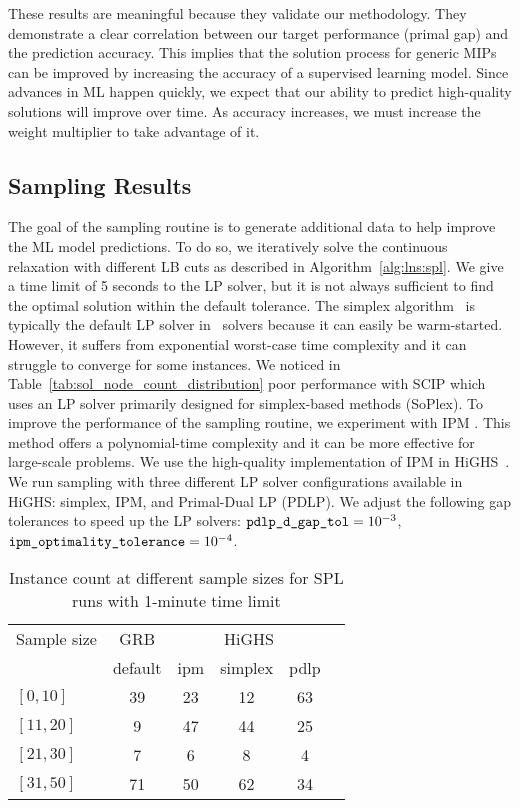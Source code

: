 \documentclass[3p, authoryear, times]{elsarticle}
\begin{document}
These results are meaningful because they validate our methodology. They demonstrate a clear correlation between our target performance (primal gap) and the prediction accuracy. This implies that the solution process for generic MIPs can be improved by increasing the accuracy of a supervised learning model. Since advances in ML happen quickly, we expect that our ability to predict high-quality solutions will improve over time. As accuracy increases, we must increase the weight multiplier to take advantage of it. 



\subsection{Sampling Results} \label{sec:lns:sampling_results}
The goal of the sampling routine is to generate additional data to help improve the ML model predictions. To do so, we iteratively solve the continuous relaxation with different LB cuts as described in Algorithm~\ref{alg:lns:spl}. We give a time limit of 5 seconds to the LP solver, but it is not always sufficient to find the optimal solution within the default tolerance.   The simplex algorithm~\citep{dantzig1951maximization} is typically the default LP solver in \bnb\ solvers because it can easily be warm-started. However, it suffers from exponential worst-case time complexity and it can struggle to converge for some instances. We noticed in Table~\ref{tab:sol_node_count_distribution} poor performance with SCIP which uses an LP solver primarily designed for simplex-based methods (SoPlex). To improve the performance of the sampling routine, we experiment with IPM \citep{karmarkar_new_1984}. This method offers a polynomial-time complexity and it can be more effective for large-scale problems. We use the high-quality implementation of IPM in HiGHS~\citep{huangfu_parallelizing_2018}. We run sampling with three different LP solver configurations available in HiGHS: simplex, IPM, and Primal-Dual LP (PDLP). We adjust the following gap tolerances to speed up the LP solvers: $\varname{pdlp_d_gap_tol} = 10^{-3}$, 
$\varname{ipm_optimality_tolerance} = 10^{-4}$. 

\begin{table}[h]
\centering
\caption{Instance count at different sample sizes for SPL runs with 1-minute time limit}
\label{tab:sample_size_distribution}
\begin{tabular}{lccccc}
\toprule
{Sample size} & {GRB} & \multicolumn{3}{c}{HiGHS} \\
{} & {default} & {ipm} & {simplex} & {pdlp} \\
\midrule
$[0, 10]$ & 39 & 23 & 12 & 63 \\
$[11, 20]$ & 9 & 47 & 44 & 25 \\
$[21, 30]$ & 7 & 6 & 8 & 4 \\
$[31, 50]$ & 71 & 50 & 62 & 34 \\
\bottomrule
\end{tabular}
\end{table}
\end{document}
